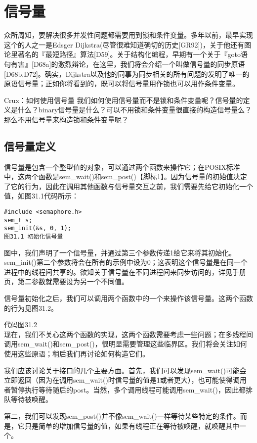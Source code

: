 \chapter{信号量}
\thispagestyle{empty}

众所周知，要解决很多并发性问题都需要用到锁和条件变量。多年以前，最早实现这个的人之一是Edsger Dijkstra(尽管很难知道确切的历史[GR92])，关于他还有图论里著名的『最短路径』算法[D59]。关于结构化编程，早期有一个关于『goto语句有害』[D68a]的激烈辩论，在这里，我们将会介绍一个叫做信号量的同步原语[D68b,D72]。确实，Dijkstra以及他的同事为同步相关的所有问题的发明了唯一的原语信号量；正如你将看到的，既可以将信号量用作锁也可以用作条件变量。

Crux：如何使用信号量
我们如何使用信号量而不是锁和条件变量呢？信号量的定义是什么？binary信号量是什么？可以不用锁和条件变量很直接的构造信号量么？那么不用信号量来构造锁和条件变量呢？

\section{信号量定义}
信号量是包含一个整型值的对象，可以通过两个函数来操作它；在POSIX标准中，这两个函数是sem\_wait()和sem\_post()【脚标1】。因为信号量的初始值决定了它的行为，因此在调用其他函数与信号量交互之前，我们需要先给它初始化一个值，如图31.1代码所示：
\begin{verbatim}
#include <semaphore.h>
sem_t s;
sem_init(&s, 0, 1);
图31.1 初始化信号量
\end{verbatim}

图中，我们声明了一个信号量，并通过第三个参数传递1给它来将其初始化。sem\_init()第二个参数将会在所有的示例中设为0；这表明这个信号量是在同一个进程中的线程间共享的。欲知关于信号量在不同进程间来同步访问的，详见手册页，第二参数就需要设为另一个不同值。

信号量初始化之后，我们可以调用两个函数中的一个来操作该信号量。这两个函数的行为见图31.2。

代码图31.2\\

现在，我们不关心这两个函数的实现，这两个函数需要考虑一些问题；在多线程间调用sem\_wait()和sem\_post()，很明显需要管理这些临界区。我们将会关注如何使用这些原语；稍后我们再讨论如何构造它们。

我们应该讨论关于接口的几个主要方面。首先，我们可以发现sem\_wait()可能会立即返回（因为在调用sem\_wait()时信号量的值是1或者更大），也可能使得调用者暂停执行等待随后的post。当然，多个调用线程可能调用sem\_wait()，因此都排队等待被唤醒。

第二，我们可以发现sem\_post()并不像sem\_wait()一样等待某些特定的条件。而是，它只是简单的增加信号量的值，如果有线程正在等待被唤醒，就唤醒其中一个。

